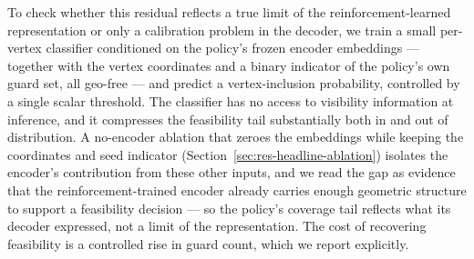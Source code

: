 \documentclass[preprint,10pt]{elsarticle}
\begin{document}
To check whether this residual reflects a true limit of the reinforcement-learned representation or only a calibration problem in the decoder, we train a small per-vertex classifier conditioned on the policy's frozen encoder embeddings --- together with the vertex coordinates and a binary indicator of the policy's own guard set, all geo-free --- and predict a vertex-inclusion probability, controlled by a single scalar threshold. The classifier has no access to visibility information at inference, and it compresses the feasibility tail substantially both in and out of distribution. A no-encoder ablation that zeroes the embeddings while keeping the coordinates and seed indicator (Section~\ref{sec:res-headline-ablation}) isolates the encoder's contribution from these other inputs, and we read the gap as evidence that the reinforcement-trained encoder already carries enough geometric structure to support a feasibility decision --- so the policy's coverage tail reflects what its decoder expressed, not a limit of the representation. The cost of recovering feasibility is a controlled rise in guard count, which we report explicitly.
\end{document}
